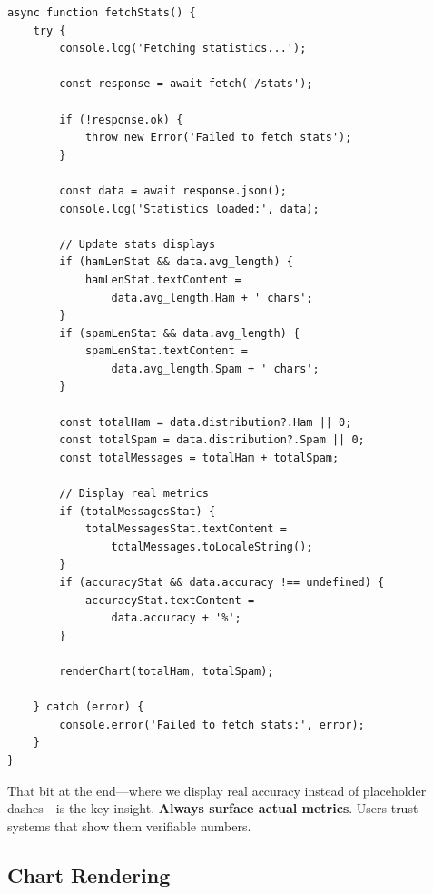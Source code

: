 \documentclass[12pt, a4paper]{article}
\begin{document}
\begin{verbatim}
async function fetchStats() {
    try {
        console.log('Fetching statistics...');
        
        const response = await fetch('/stats');
        
        if (!response.ok) {
            throw new Error('Failed to fetch stats');
        }
        
        const data = await response.json();
        console.log('Statistics loaded:', data);
        
        // Update stats displays
        if (hamLenStat && data.avg_length) {
            hamLenStat.textContent = 
                data.avg_length.Ham + ' chars';
        }
        if (spamLenStat && data.avg_length) {
            spamLenStat.textContent = 
                data.avg_length.Spam + ' chars';
        }
        
        const totalHam = data.distribution?.Ham || 0;
        const totalSpam = data.distribution?.Spam || 0;
        const totalMessages = totalHam + totalSpam;
        
        // Display real metrics
        if (totalMessagesStat) {
            totalMessagesStat.textContent = 
                totalMessages.toLocaleString();
        }
        if (accuracyStat && data.accuracy !== undefined) {
            accuracyStat.textContent = 
                data.accuracy + '%';
        }
        
        renderChart(totalHam, totalSpam);
        
    } catch (error) {
        console.error('Failed to fetch stats:', error);
    }
}
\end{verbatim}

\begin{devnote}
That bit at the end---where we display real accuracy instead of placeholder dashes---is the key insight. \textbf{Always surface actual metrics}. Users trust systems that show them verifiable numbers.
\end{devnote}

\subsection{Chart Rendering}
\end{document}
